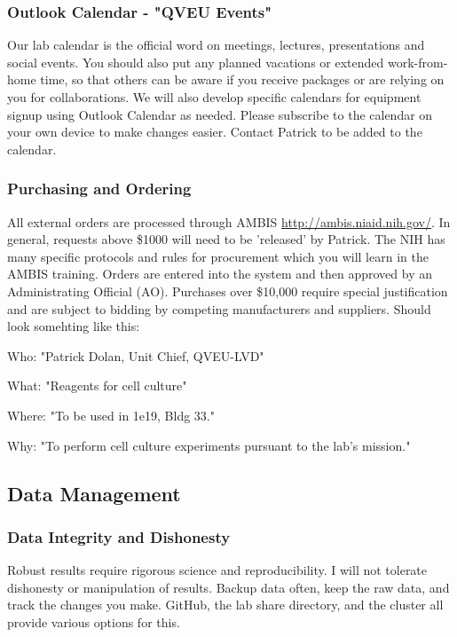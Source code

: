 \documentclass[10pt, letterpaper, twocolumn]{article} %
\begin{document}
\subsubsection{Outlook Calendar - "QVEU Events"}
Our lab calendar is the official word on meetings, lectures, presentations and social events. You should also put any planned vacations or extended work-from-home time, so that others can be aware if you receive packages or are relying on you for collaborations. We will also develop specific calendars for equipment signup using Outlook Calendar as needed. Please subscribe to the calendar on your own device to make changes easier. Contact Patrick to be added to the calendar.

\subsubsection{Purchasing and Ordering}
All external orders are processed through AMBIS \href{http://ambis.niaid.nih.gov/}{http://ambis.niaid.nih.gov/}. In general, requests above \$1000 will need to be 'released' by Patrick. The NIH has many specific protocols and rules for procurement which you will learn in the AMBIS training. Orders are entered into the system and then approved by an Administrating Official (AO). Purchases over \$10,000 require special justification and are subject to bidding by competing manufacturers and suppliers. 
Should look somehting like this: 
\begin{description}
\item Who: "Patrick Dolan, Unit Chief, QVEU-LVD"
\item What: "Reagents for cell culture"
\item Where: "To be used in 1e19, Bldg 33."
\item Why: "To perform cell culture experiments pursuant to the lab's mission."
\end{description}

\subsection{Data Management}
\subsubsection{Data Integrity and Dishonesty}
Robust results require rigorous science and reproducibility. I will not tolerate dishonesty or manipulation of results. Backup data often, keep the raw data, and track the changes you make. GitHub, the lab share directory, and the cluster all provide various options for this.
\end{document}
